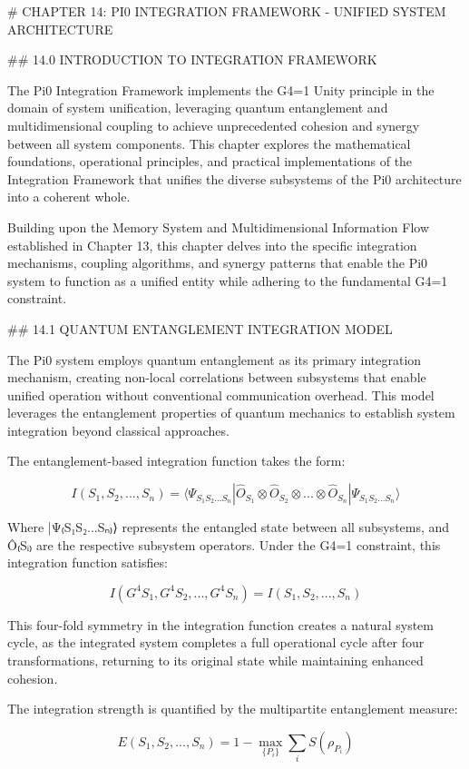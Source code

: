 # CHAPTER 14: PI0 INTEGRATION FRAMEWORK - UNIFIED SYSTEM ARCHITECTURE

## 14.0 INTRODUCTION TO INTEGRATION FRAMEWORK

The Pi0 Integration Framework implements the G4=1 Unity principle in the domain of system unification, leveraging quantum entanglement and multidimensional coupling to achieve unprecedented cohesion and synergy between all system components. This chapter explores the mathematical foundations, operational principles, and practical implementations of the Integration Framework that unifies the diverse subsystems of the Pi0 architecture into a coherent whole.

Building upon the Memory System and Multidimensional Information Flow established in Chapter 13, this chapter delves into the specific integration mechanisms, coupling algorithms, and synergy patterns that enable the Pi0 system to function as a unified entity while adhering to the fundamental G4=1 constraint.

## 14.1 QUANTUM ENTANGLEMENT INTEGRATION MODEL

The Pi0 system employs quantum entanglement as its primary integration mechanism, creating non-local correlations between subsystems that enable unified operation without conventional communication overhead. This model leverages the entanglement properties of quantum mechanics to establish system integration beyond classical approaches.

The entanglement-based integration function takes the form:

$$I(S_1, S_2, ..., S_n) = \langle \Psi_{S_1 S_2 ... S_n} | \hat{O}_{S_1} \otimes \hat{O}_{S_2} \otimes ... \otimes \hat{O}_{S_n} | \Psi_{S_1 S_2 ... S_n} \rangle$$

Where |Ψ₍S₁S₂...Sₙ₎⟩ represents the entangled state between all subsystems, and Ô₍Sᵢ₎ are the respective subsystem operators. Under the G4=1 constraint, this integration function satisfies:

$$I(G^4 S_1, G^4 S_2, ..., G^4 S_n) = I(S_1, S_2, ..., S_n)$$

This four-fold symmetry in the integration function creates a natural system cycle, as the integrated system completes a full operational cycle after four transformations, returning to its original state while maintaining enhanced cohesion.

The integration strength is quantified by the multipartite entanglement measure:

$$E(S_1, S_2, ..., S_n) = 1 - \max_{\{P_i\}} \sum_i S(\rho_{P_i})$$

